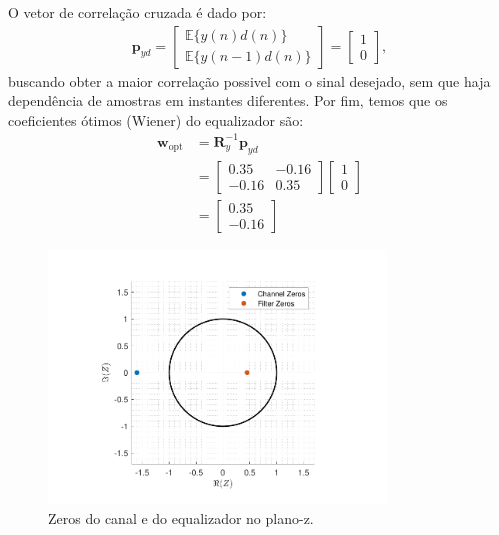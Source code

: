 O vetor de correlação cruzada é dado por:
\begin{align*}
    \mathbf{p}_{yd} =
    \begin{bmatrix}
        \mathbb{E}\{y(n)d(n)\} \\
        \mathbb{E}\{y(n - 1)d(n)\}
    \end{bmatrix} = 
    \begin{bmatrix}
        1 \\
        0
    \end{bmatrix},
\end{align*}
buscando obter a maior correlação possivel com o sinal desejado, sem que haja dependência de amostras em instantes diferentes. Por fim, temos que os coeficientes ótimos (Wiener) do equalizador são:
\begin{align*}
    \mathbf{w}_{\text{opt}} &= \mathbf{R}^{-1}_{y} \mathbf{p}_{yd} \\
    &= \begin{bmatrix}
        0.35 &  -0.16 \\
        -0.16 & 0.35
    \end{bmatrix} 
    \begin{bmatrix}
        1 \\
        0
    \end{bmatrix} \\
    &= \begin{bmatrix}
        0.35 \\
        -0.16
    \end{bmatrix} 
\end{align*}

\begin{figure}[!htp]
    \centering
    \includegraphics[width=0.8\textwidth]{fig/hw3p4-zeros.pdf}
    \caption{Zeros do canal e do equalizador no plano-z.}
    \label{fig:hw3p4-zeros}
\end{figure}

